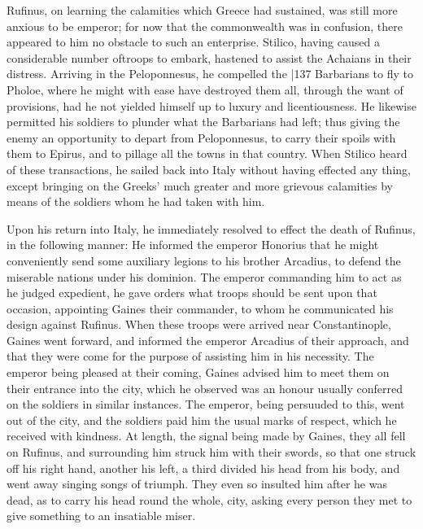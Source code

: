 Rufinus, on learning the calamities which Greece had sustained, was still more anxious to be emperor; for now that the commonwealth was in confusion, there appeared to him no obstacle to such an enterprise. Stilico, having caused a considerable number of\emph{}troops to embark, hastened to assist the Achaians in their distress. Arriving in the Peloponnesus, he compelled the
|137 Barbarians to fly to Pholoe, where he might with ease have destroyed them all, through the want of provisions, had he not yielded himself up to luxury and licentiousness. He likewise permitted his soldiers to plunder what the Barbarians had left; thus giving the enemy an opportunity to depart from Peloponnesus, to carry their spoils with them to Epirus, and to pillage all the towns in that country. When Stilico heard of these transactions, he sailed back into Italy without having effected any thing, except bringing on the Greeks' much greater and more grievous calamities by means of the soldiers whom he had taken with him.

Upon his return into Italy, he immediately resolved to effect the death of Rufinus, in the following manner: He informed the emperor Honorius that he might conveniently send some auxiliary legions to his brother Arcadius, to defend the miserable nations under his dominion. The emperor commanding him to act as he judged expedient, he gave orders what troops should be sent upon that occasion, appointing Gaines their commander, to whom he communicated his design against Rufinus. When these troops were arrived near Constantinople, Gaines went forward, and informed the emperor Arcadius of their approach, and that they were come for the purpose of assisting him in his necessity. The emperor being pleased at their coming, Gaines advised him to meet them on their entrance into the city, which he observed was an honour usually conferred on the soldiers in similar instances. The emperor, being persuuded to this, went out of the city, and the soldiers paid him the usual marks of respect, which he received with kindness. At length, the signal being made by Gaines, they all fell on Rufinus, and surrounding him struck him with their swords, so that one struck off his right hand, another his left, a third divided his head from his body, and went away singing songs of triumph. They even so insulted him after he
was dead, as to carry his head round the whole, city, asking every person they met to give something to an insatiable miser.

